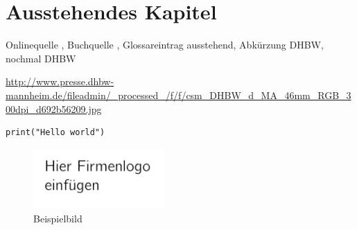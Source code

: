 \section{Ausstehendes Kapitel}

Onlinequelle \cite{OnlineKey}, Buchquelle \cite[S.~1]{BookKey}, Glossareintrag \gls{ausstehend}, Abkürzung \ac{DHBW}, nochmal \ac{DHBW}

\begin{sloppypar}
\url{http://www.presse.dhbw-mannheim.de/fileadmin/_processed_/f/f/csm_DHBW_d_MA_46mm_RGB_300dpi_d692b56209.jpg} %
\end{sloppypar}

\begin{lstlisting}
print("Hello world")
\end{lstlisting}

\begin{figure}
    \caption{Beispielbild}
    \includegraphics[width=5cm]{bilder/logo.png}
\end{figure}
